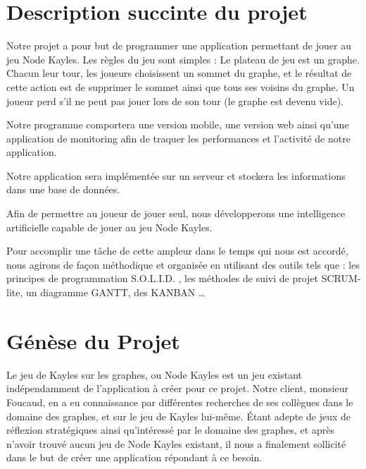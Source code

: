 \documentclass[a4paper, 12pt,table]{report}
\begin{document}
\section{Description succinte du projet}
Notre projet a pour but de programmer une application permettant de jouer au jeu Node Kayles. Les règles du jeu sont simples :
Le plateau de jeu est un graphe. Chacun leur tour, les joueurs choisissent un sommet du graphe, et le résultat de cette action est de supprimer le sommet ainsi que tous ses voisins du graphe. Un joueur perd s'il ne peut pas jouer lors de son tour (le graphe est devenu vide).

Notre programme comportera une version mobile, une version web ainsi qu'une application de monitoring afin de traquer les performances et l'activité de notre application.

Notre application sera implémentée sur un serveur et stockera les informations dans une base de données.

Afin de permettre au joueur de jouer seul, nous développerons une intelligence artificielle capable de jouer au jeu Node Kayles.

Pour accomplir une tâche de cette ampleur dans le temps qui nous est accordé, nous agirons de façon méthodique et organisée en utilisant des outils tels que : les principes de programmation S.O.L.I.D. , les méthodes de suivi de projet SCRUM-lite, un diagramme GANTT, des KANBAN …

\section{Génèse du Projet}
Le jeu de Kayles sur les graphes, ou Node Kayles est un jeu existant indépendamment de l’application à créer pour ce projet.
Notre client, monsieur Foucaud, en a eu connaissance par différentes recherches de ses collègues dans le domaine des graphes, et sur le jeu de Kayles lui-même.
Étant adepte de jeux de réflexion stratégiques ainsi qu’intéressé par le domaine des graphes, et après n’avoir trouvé aucun jeu de Node Kayles existant, il nous a finalement sollicité dans le but de créer une application répondant à ce besoin.

\clearpage
\end{document}
